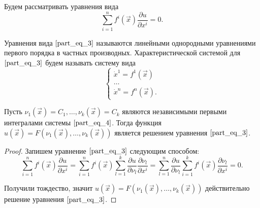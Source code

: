 Будем рассматривать уравнения вида
\begin{equation}
	\sum \limits_{i = 1}^{n} f^{i} \left( \vec{x} \right) \frac{\partial u}{\partial x^{i}} = 0.
	\label{part_eq_3}
\end{equation}

\begin{definition}
	Уравнения вида $\eqref{part_eq_3}$ называются линейными однородными уравнениями первого порядка в частных производных. Характеристической системой для $\eqref{part_eq_3}$ будем называть систему вида
	\begin{equation}
		\begin{cases}
			\dot{x}^1 = f^1 \left( \vec{x} \right) \\
			\dots                                             \\
			\dot{x}^n = f^n \left( \vec{x} \right).
		\end{cases}
		\label{part_eq_4}
	\end{equation}
\end{definition}

\begin{theorem}
	Пусть $\nu_1 \left( \vec{x} \right) = C_1, \dots, \nu_k \left( \vec{x} \right) = C_k$ являются независимыми первыми интегралами системы $\eqref{part_eq_4}$. Тогда функция $u \left( \vec{x} \right) = F \left( \nu_1 \left( \vec{x} \right), \dots, \nu_k \left( \vec{x} \right) \right) $ является решением уравнения $\eqref{part_eq_3}$.
\end{theorem}
\begin{proof}
	Запишем уравнение $\eqref{part_eq_3}$ следующим способом:
	\begin{equation*}
		\sum \limits_{i = 1}^{n} f^{i} \left( \vec{x} \right)  \frac{\partial u}{\partial x^{i}} = \sum \limits_{i = 1}^{n} f^{i} \left( \vec{x} \right)  \sum \limits_{l = 1}^{k} \frac{\partial u}{\partial \nu_l} \frac{\partial \nu_l}{\partial x^{i}} = \sum \limits_{l = 1}^{n} \frac{\partial u}{\partial \nu_l} \sum \limits_{i = 1}^{k} f^{i} \left( \vec{x} \right)  \frac{\partial \nu_l}{\partial x^{i}} = 0.
	\end{equation*}
	
	Получили тождество, значит $u \left( \vec{x} \right) = F \left( \nu_1 \left( \vec{x} \right), \dots, \nu_k \left( \vec{x} \right) \right)$ действительно решение уравнения $\eqref{part_eq_3}$.
\end{proof}


